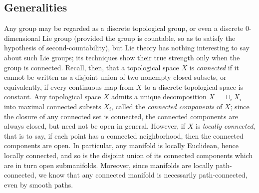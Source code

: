 \documentclass[reqno]{amsart} 
\begin{document}
\subsection{Generalities}
\label{sec:org948d2a7}
Any group may be regarded as a discrete topological group, or
even a discrete $0$-dimensional Lie group (provided the group is countable,
so as to satisfy the hypothesis of second-countability), but Lie theory has
nothing interesting to say about such Lie groups; its techniques
show their true strength only when the group is connected.
Recall, then, that a topological space $X$ is \emph{connected}
if it cannot be written as a disjoint union of two nonempty
closed subsets, or equivalently, if every continuous map from
$X$ to a discrete topological space is constant.  Any
topological space $X$ admits a unique decomposition
$X = \sqcup_{i} X_i$ into maximal connected subsets $X_i$,
called the \emph{connected components} of $X$; since the closure
of any connected set is connected, the connected components are
always closed, but need not be open in general.  However, if $X$
is \emph{locally connected}, that is to say, if each point has a
connected neighborhood, then the connected components are open.
In particular, any manifold is locally Euclidean, hence locally
connected, and so is the disjoint union of its connected
components which are in turn open submanifolds.  Moreover, since
manifolds are locally path-connected, we know that any connected
manifold is necessarily path-connected, even by smooth paths.
\end{document}
